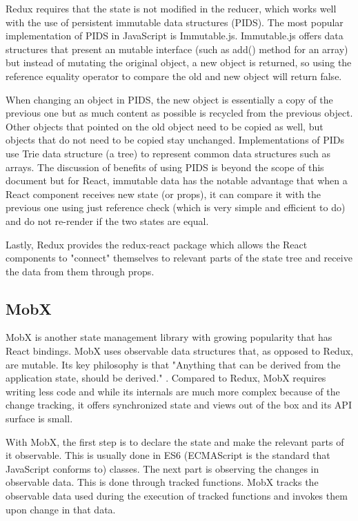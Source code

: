 Redux requires that the state is not modified in the reducer, which works well with the use of persistent immutable data structures \cite{redux:intro} (PIDS). The most popular implementation of PIDS in JavaScript is Immutable.js. Immutable.js offers data structures that present an mutable interface (such as add() method for an array) but instead of mutating the original object, a new object is returned, so using the reference equality operator to compare the old and new object will return false.

When changing an object in PIDS, the new object is essentially a copy of the previous one but as much content as possible is recycled from the previous object. Other objects that pointed on the old object need to be copied as well, but objects that do not need to be copied stay unchanged. Implementations of PIDs use Trie data structure (a tree) to represent common data structures such as arrays. The discussion of benefits of using PIDS is beyond the scope of this document but for React, immutable data has the notable advantage that when a React component receives new state (or props), it can compare it with the previous one using just reference check (which is very simple and efficient to do) and do not re-render if the two states are equal.

Lastly, Redux provides the redux-react package which allows the React components to "connect" themselves to relevant parts of the state tree and receive the data from them through props.


\subsection{MobX}

MobX is another state management library with growing popularity that has React bindings. MobX uses observable data structures that, as opposed to Redux, are mutable. Its key philosophy is that "Anything that can be derived from the application state, should be derived." \cite{mobx:intro}. Compared to Redux, MobX requires writing less code and while its internals are much more complex because of the change tracking, it offers synchronized state and views out of the box and its API surface is small.

With MobX, the first step is to declare the state and make the relevant parts of it observable. This is usually done in ES6 (ECMAScript  is the standard that JavaScript conforms to) classes.
The next part is observing the changes in observable data. This is done through tracked functions. MobX tracks the observable data used during the execution of tracked functions and invokes them upon change in that data. 

